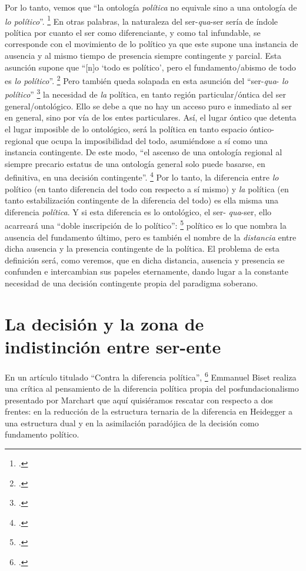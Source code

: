 Por lo tanto, vemos que \enquote{la ontología \emph{política} no equivale sino a una ontología de \emph{lo político}}. \footcite[219]{@7093-MARCHART2009} En otras palabras, la naturaleza del ser-\emph{qua}-ser sería de índole política por cuanto el ser como diferenciante, y como tal infundable, se corresponde con el movimiento de lo político ya que este supone una instancia de ausencia  y al mismo tiempo de presencia  siempre contingente y parcial. Esta asunción supone que \enquote{{[}n{]}o \enquote{todo es político}, pero el fundamento/abismo de todo es \emph{lo político}}. \footcite[223]{@7093-MARCHART2009} Pero también queda solapada en esta asunción del \enquote{ser-\emph{qua}- \emph{lo político}} \footcite[220]{@7093-MARCHART2009} la necesidad de \emph{la} política, en tanto región particular/óntica del ser general/ontológico. Ello se debe a que no hay un acceso puro e inmediato al ser en general, sino por vía de los entes particulares. Así, el lugar óntico que detenta el lugar imposible de lo ontológico, será la política en tanto espacio óntico-regional que ocupa la imposibilidad del todo, asumiéndose a sí como una instancia contingente. De este modo, \enquote{el ascenso de una ontología regional al siempre precario estatus de una ontología general solo puede basarse, en definitiva, en una decisión contingente}. \footcite[226]{@7093-MARCHART2009} Por lo tanto, la diferencia entre \emph{lo} político (en tanto diferencia del todo con respecto a sí mismo) y \emph{la} política (en tanto estabilización contingente de la diferencia del todo) es ella misma una diferencia \emph{política}. Y si esta diferencia es lo ontológico, el ser- \emph{qua}-ser, ello acarreará una \enquote{doble inscripción de lo político}: \footcite[227]{@7093-MARCHART2009} político es lo que nombra la ausencia del fundamento último, pero es también el nombre de la \emph{distancia} entre dicha ausencia y la presencia contingente de la política. El problema de esta definición será, como veremos, que en dicha distancia, ausencia y presencia se confunden e intercambian sus papeles eternamente, dando lugar a la constante necesidad de una decisión contingente propia del paradigma soberano.

\section{La decisión y la zona de indistinción entre ser-ente} %

En un artículo titulado \enquote{Contra la diferencia política}, \footcite{@7074-BISET2010} Emmanuel Biset realiza una crítica al pensamiento de la diferencia política propia del posfundacionalismo presentado por Marchart que aquí quisiéramos rescatar con respecto a dos frentes: en la reducción de la estructura ternaria de la diferencia en Heidegger a una estructura dual y en la asimilación paradójica de la decisión como fundamento político.

